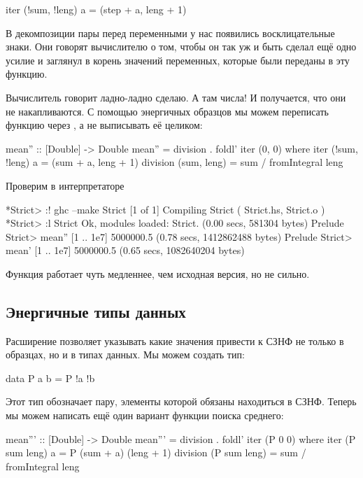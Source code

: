 \begin{code}
iter (!sum, !leng) a = (step + a, leng + 1)
\end{code}

В декомпозиции пары перед переменными у нас появились 
восклицательные знаки. Они говорят вычислителю о том, 
чтобы он так уж и быть сделал ещё одно усилие и заглянул в корень
значений переменных, которые были переданы в эту функцию. 

Вычислитель говорит ладно-ладно сделаю. А там числа! И
получается, что они не накапливаются. С помощью
энергичных образцов мы можем переписать функцию  
через , а не выписывать её целиком:

\begin{code}
mean'' :: [Double] -> Double
mean'' = division . foldl' iter (0, 0)
    where iter (!sum, !leng) a = (sum  + a, leng + 1)
          division (sum, leng) = sum / fromIntegral leng
\end{code}

Проверим в интерпретаторе

\begin{code}
*Strict> :! ghc --make Strict
[1 of 1] Compiling Strict           ( Strict.hs, Strict.o )
*Strict> :l Strict
Ok, modules loaded: Strict.
(0.00 secs, 581304 bytes)
Prelude Strict> mean'' [1 .. 1e7]
5000000.5
(0.78 secs, 1412862488 bytes)
Prelude Strict> mean' [1 .. 1e7]
5000000.5
(0.65 secs, 1082640204 bytes)
\end{code}

Функция работает чуть медленнее, чем исходная версия, но не
сильно.

\subsection{Энергичные типы данных}

Расширение  позволяет указывать какие
значения привести к СЗНФ не только в образцах, но и в 
типах данных. Мы можем создать тип:

\begin{code}
data P a b = P !a !b
\end{code}

Этот тип обозначает пару, элементы которой обязаны находиться
в СЗНФ. Теперь мы можем написать ещё один вариант функции
поиска среднего:

\begin{code}
mean''' :: [Double] -> Double
mean''' = division . foldl' iter (P 0 0)
    where iter (P sum leng) a = P (sum  + a) (leng + 1)
          division (P sum leng) = sum / fromIntegral leng
\end{code}

